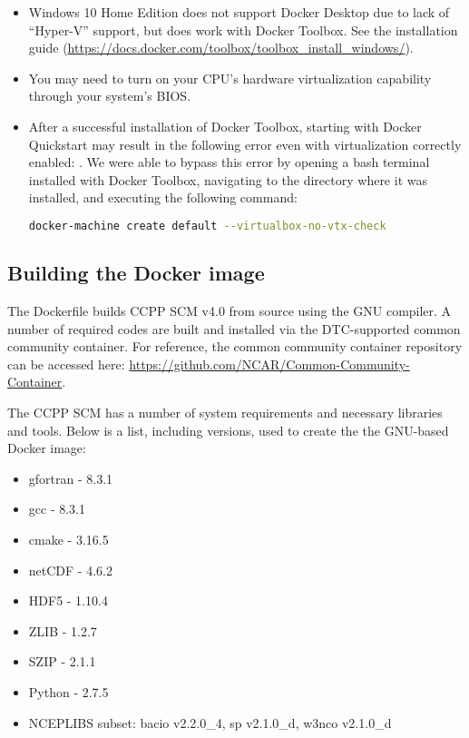 \begin{itemize}
\item Windows 10 Home Edition does not support Docker Desktop due to lack of ``Hyper-V'' support, but does work with Docker Toolbox. See the installation guide (\url{https://docs.docker.com/toolbox/toolbox_install_windows/}).
\item You may need to turn on your CPU's hardware virtualization capability through your system's BIOS.
\item After a successful installation of Docker Toolbox, starting with Docker Quickstart may result in the following error even with virtualization correctly enabled: . We were able to bypass this error by opening a bash terminal installed with Docker Toolbox, navigating to the directory where it was installed, and executing the following command:
\begin{lstlisting}[language=bash]
docker-machine create default --virtualbox-no-vtx-check
\end{lstlisting}
\end{itemize}

\subsection{Building the Docker image}

The Dockerfile builds CCPP SCM v4.0 from source using the GNU compiler. A number of required codes are built and installed via the DTC-supported common community container. For reference, the common community container repository can be accessed here: \url{https://github.com/NCAR/Common-Community-Container}.

The CCPP SCM has a number of system requirements and necessary libraries and tools. Below is a list, including versions, used to create the the GNU-based Docker image:
\begin{itemize}
\item gfortran - 8.3.1
\item gcc - 8.3.1
\item cmake - 3.16.5
\item netCDF - 4.6.2
\item HDF5 - 1.10.4
\item ZLIB - 1.2.7
\item SZIP - 2.1.1
\item Python - 2.7.5
\item NCEPLIBS subset: bacio v2.2.0\_4, sp v2.1.0\_d, w3nco v2.1.0\_d
\end{itemize}

